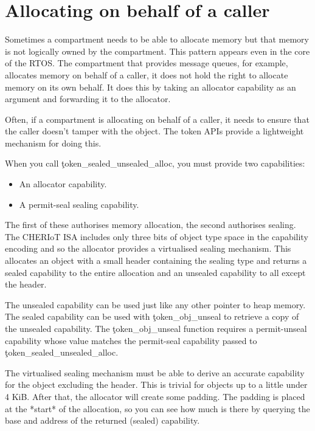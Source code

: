 \section[label=token_apis]{Allocating on behalf of a caller}

Sometimes a compartment needs to be able to allocate memory but that memory is not logically owned by the compartment.
This pattern appears even in the core of the RTOS.
The compartment that provides message queues, for example, allocates memory on behalf of a caller, it does not hold the right to allocate memory on its own behalf.
It does this by taking an allocator capability as an argument and forwarding it to the allocator.

Often, if a compartment is allocating on behalf of a caller, it needs to ensure that the caller doesn't tamper with the object.
The token APIs provide a lightweight mechanism for doing this.




When you call \c{token_sealed_unsealed_alloc}, you must provide two capabilities:

\begin{itemize}
	\item{An allocator capability.}
	\item{A permit-seal sealing capability.}
\end{itemize}

The first of these authorises memory allocation, the second authorises sealing.
The CHERIoT ISA includes only three bits of object type space in the capability encoding and so the allocator provides a virtualised sealing mechanism.
This allocates an object with a small header containing the sealing type and returns a sealed capability to the entire allocation and an unsealed capability to all except the header.

The unsealed capability can be used just like any other pointer to heap memory.
The sealed capability can be used with \c{token_obj_unseal} to retrieve a copy of the unsealed capability.
The \c{token_obj_unseal} function requires a permit-unseal capability whose value matches the permit-seal capability passed to \c{token_sealed_unsealed_alloc}.

\begin{note}
The virtualised sealing mechanism must be able to derive an accurate capability for the object excluding the header.
This is trivial for objects up to a little under 4 KiB.
After that, the allocator will create some padding.
The padding is placed at the *start* of the allocation, so you can see how much is there by querying the base and address of the returned (sealed) capability.
\end{note}

